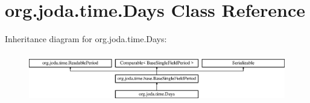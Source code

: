 \hypertarget{classorg_1_1joda_1_1time_1_1_days}{\section{org.\-joda.\-time.\-Days Class Reference}
\label{classorg_1_1joda_1_1time_1_1_days}
}
Inheritance diagram for org.\-joda.\-time.\-Days\-:\begin{figure}[H]
\begin{center}
\leavevmode
\includegraphics[height=2.187500cm]{classorg_1_1joda_1_1time_1_1_days}
\end{center}
\end{figure}
